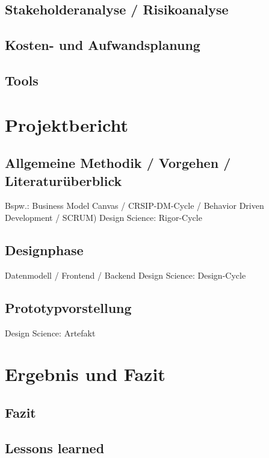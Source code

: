 \documentclass[a4paper, 12pt]{article}
\begin{document}
    \subsection{Stakeholderanalyse / Risikoanalyse}
    
    \subsection{Kosten- und Aufwandsplanung}

    \subsection{Tools}\label{subsec:tools}

    \newpage
    
    \section{Projektbericht}
    
    \subsection{Allgemeine Methodik / Vorgehen / Literaturüberblick}
    Bspw.: Business Model Canvas / CRSIP-DM-Cycle / Behavior Driven Development / SCRUM)
    Design Science: Rigor-Cycle
    
    \subsection{Designphase}\label{subsec:designphase}
    Datenmodell / Frontend / Backend
    Design Science: Design-Cycle
    
    \subsection{Prototypvorstellung}
    Design Science: Artefakt

    \newpage
    
    \section{Ergebnis und Fazit}
    
    \subsection{Fazit}
    
    \subsection{Lessons learned}
    
\end{document}
